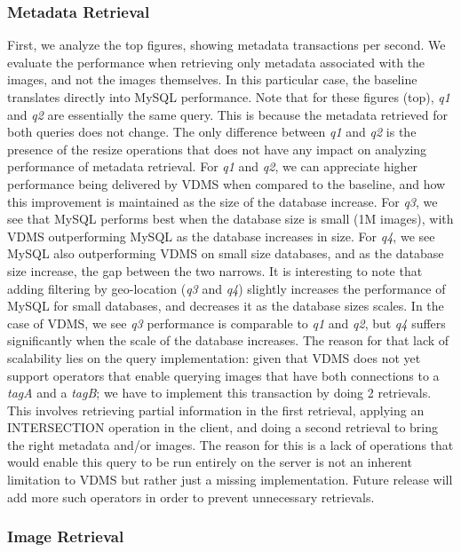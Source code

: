 \subsubsection{Metadata Retrieval}

First, we analyze the top figures, showing metadata transactions per second.
We evaluate the performance when retrieving only metadata associated with the images,
and not the images themselves.
In this particular case, the baseline translates directly into MySQL performance.
Note that for these figures (top), \textit{q1} and \textit{q2} are
essentially the same query. This is because the metadata retrieved for both
queries does not change. The only difference between \textit{q1} and \textit{q2}
is the presence of the resize operations that does not have any impact on
analyzing performance of metadata retrieval.
For \textit{q1} and \textit{q2}, we can appreciate higher performance being delivered by
VDMS when compared to the baseline, and how this improvement is maintained
as the size of the database increase.
For \textit{q3}, we see that MySQL performs best when the database size
is small (1M images), with VDMS outperforming MySQL as the database increases in size.
For \textit{q4}, we see MySQL also outperforming VDMS on small size databases, and as
the database size increase, the gap between the two narrows.
It is interesting to note that adding filtering by geo-location
(\textit{q3} and \textit{q4}) slightly increases the performance of MySQL
for small databases, and decreases it as the database sizes scales.
In the case of VDMS, we see \textit{q3} performance is comparable to \textit{q1}
and \textit{q2}, but \textit{q4} suffers significantly when the scale of the database
increases.
The reason for that lack of scalability lies on the query implementation: given that
VDMS does not yet support operators that enable querying images 
that have both connections to a \textit{tagA} and a \textit{tagB}; 
we have to implement this transaction by doing 2 retrievals.
This involves retrieving partial information in the first retrieval, 
applying an INTERSECTION operation in the client, and doing a second retrieval
to bring the right metadata and/or images.
The reason for this is a lack of operations that would enable this query to be
run entirely on the server is not an inherent limitation to VDMS but rather
just a missing implementation.
Future release will add more such operators in order to prevent 
unnecessary retrievals.

\subsubsection{Image Retrieval}


